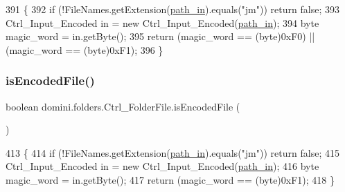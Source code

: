 \begin{DoxyCode}
391                                \{
392         \textcolor{keywordflow}{if} (!FileNames.getExtension(\hyperlink{classdomini_1_1folders_1_1Ctrl__FolderFile_a0d3946bb2832a1f34d0c2227df5c71c4}{path\_in}).equals(\textcolor{stringliteral}{"jm"})) \textcolor{keywordflow}{return} \textcolor{keyword}{false};
393         Ctrl\_Input\_Encoded in = \textcolor{keyword}{new} Ctrl\_Input\_Encoded(\hyperlink{classdomini_1_1folders_1_1Ctrl__FolderFile_a0d3946bb2832a1f34d0c2227df5c71c4}{path\_in});
394         byte magic\_word = in.getByte();
395         \textcolor{keywordflow}{return} (magic\_word == (byte)0xF0) || (magic\_word == (byte)0xF1);
396     \}
\end{DoxyCode}
\mbox{\label{classdomini_1_1folders_1_1Ctrl__FolderFile_a3198690e1ecc46e00431f35d87080d79}} 
\subsubsection{\texorpdfstring{is\+Encoded\+File()}{isEncodedFile()}}
{\footnotesize\ttfamily boolean domini.\+folders.\+Ctrl\+\_\+\+Folder\+File.\+is\+Encoded\+File (\begin{DoxyParamCaption}{ }\end{DoxyParamCaption})\hspace{0.3cm}{\ttfamily [inline]}}


\begin{DoxyCode}
413                                    \{
414         \textcolor{keywordflow}{if} (!FileNames.getExtension(\hyperlink{classdomini_1_1folders_1_1Ctrl__FolderFile_a0d3946bb2832a1f34d0c2227df5c71c4}{path\_in}).equals(\textcolor{stringliteral}{"jm"})) \textcolor{keywordflow}{return} \textcolor{keyword}{false};
415         Ctrl\_Input\_Encoded in = \textcolor{keyword}{new} Ctrl\_Input\_Encoded(\hyperlink{classdomini_1_1folders_1_1Ctrl__FolderFile_a0d3946bb2832a1f34d0c2227df5c71c4}{path\_in});
416         byte magic\_word = in.getByte();
417         \textcolor{keywordflow}{return} (magic\_word == (byte)0xF1);
418     \}
\end{DoxyCode}
\mbox{\label{classdomini_1_1folders_1_1Ctrl__FolderFile_a095e6037e5cdf9a43806a308ca028791}} 
